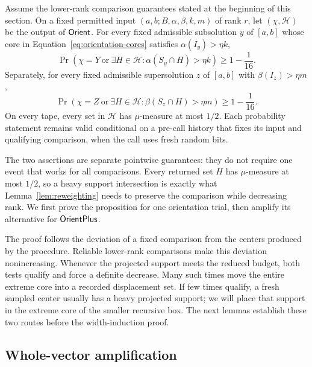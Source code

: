 \begin{proposition}[Orientation]
\label{prop:orientation}
Assume the lower-rank comparison guarantees stated at the beginning of
this section. On a fixed permitted input
\((a,b;B,\alpha,\beta,k,m)\) of rank \(r\), let
\((\chi,\mathcal H)\) be the output of \(\mathsf{Orient}\).
For every fixed admissible subsolution \(y\) of \([a,b]\) whose core
in Equation~\eqref{eq:orientation-cores} satisfies
\(\alpha(I_y)>\eta k\),
\begin{equation}
\label{ori:positive-alternative}
  \Pr\left(
     \chi=Y
     \ \text{or}\
     \exists H\in\mathcal H:
          \alpha(S_y\cap H)>\eta k
  \right)\geq 1-\frac1{16}.
\end{equation}
Separately, for every fixed admissible supersolution \(z\) of
\([a,b]\) with \(\beta(I_z)>\eta m\),
\begin{equation}
\label{ori:negative-alternative}
  \Pr\left(
     \chi=Z
     \ \text{or}\
     \exists H\in\mathcal H:
          \beta(S_z\cap H)>\eta m
  \right)\geq 1-\frac1{16}.
\end{equation}
On every tape, every set in \(\mathcal H\) has \(\mu\)-measure at
most \(1/2\). Each probability statement remains valid conditional
on a pre-call history that fixes its input and qualifying comparison,
when the call uses fresh random bits.
\end{proposition}

The two assertions are separate pointwise guarantees: they do not
require one event that works for all comparisons. Every returned set
\(H\) has \(\mu\)-measure at most \(1/2\), so a heavy support
intersection is exactly what Lemma~\ref{lem:reweighting} needs to
preserve the comparison while decreasing rank. We first prove the
proposition for one orientation trial, then amplify its alternative
for \(\mathsf{OrientPlus}\).

The proof follows the deviation of a fixed comparison from the centers
produced by the procedure. Reliable lower-rank comparisons make this
deviation nonincreasing. Whenever the projected support meets the
reduced budget, both tests qualify and force a definite decrease.
Many such times move the entire extreme core into a recorded
displacement set. If few times qualify, a fresh sampled center usually
has a heavy projected support; we will place that support in the
extreme core of the smaller recursive box. The next lemmas establish
these two routes before the width-induction proof.

\subsection{Whole-vector amplification}

